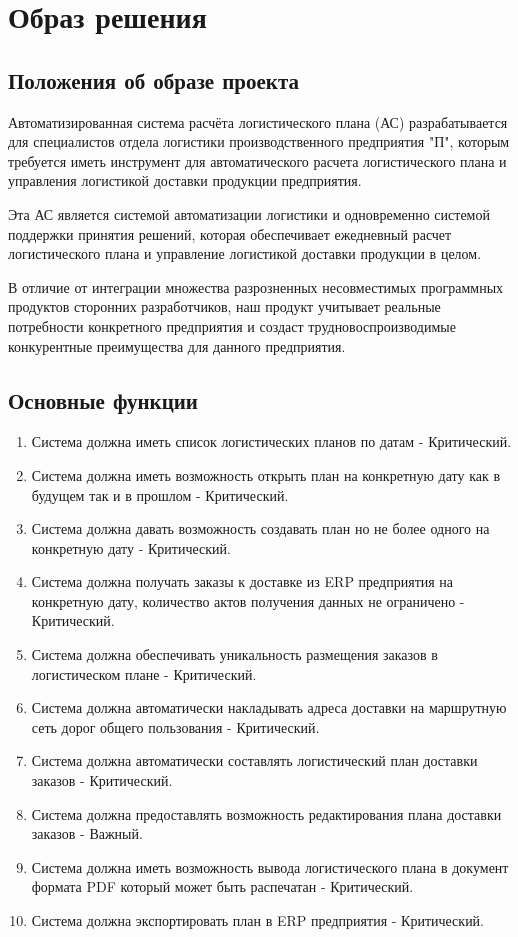 \chapter{Образ решения}
\label{ch:chap2}


\section{Положения об образе проекта}
\label{sec:vision}

Автоматизированная система расчёта логистического плана (АС) разрабатывается для специалистов отдела логистики производственного предприятия "П",
которым требуется иметь инструмент для автоматического расчета логистического плана и управления логистикой доставки продукции предприятия.

Эта АС является системой автоматизации логистики и одновременно системой поддержки принятия решений,
которая обеспечивает ежедневный расчет логистического плана и управление логистикой доставки продукции в целом.

В отличие от интеграции множества разрозненных несовместимых программных продуктов сторонних разработчиков,
наш продукт учитывает реальные потребности конкретного предприятия и создаст трудновоспроизводимые конкурентные преимущества для данного предприятия.


\section{Основные функции}
\label{sec:fun}

\begin{enumerate}
    \item Система должна иметь список логистических планов по датам - Критический.
    \item Система должна иметь возможность открыть план на конкретную дату как в будущем так и в прошлом - Критический.
    \item Система должна давать возможность создавать план но не более одного на конкретную дату - Критический.
    \item Система должна получать заказы к доставке из ERP предприятия на конкретную дату, количество актов получения данных не ограничено - Критический.
    \item Система должна обеспечивать уникальность размещения заказов в логистическом плане - Критический.
    \item Система должна автоматически накладывать адреса доставки на маршрутную сеть дорог общего пользования - Критический.
    \item Система должна автоматически составлять логистический план доставки заказов - Критический.
    \item Система должна предоставлять возможность редактирования плана доставки заказов - Важный.
    \item Система должна иметь возможность вывода логистического плана в документ формата PDF который может быть распечатан - Критический.
    \item Система должна экспортировать план в ERP предприятия - Критический.
\end{enumerate}


